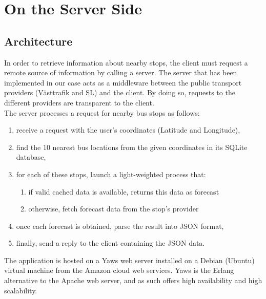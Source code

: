 \chapter{On the Server Side}
\label{cha:on_the_server_side}

\section{Architecture}

In order to retrieve information about nearby stops, the client must request a remote source of information by calling a server. The server that has been implemented in our case acts as a middleware between the public transport providers (Västtrafik and SL) and the client. By doing so, requests to the different providers are transparent to the client.\\

The server processes a request for nearby bus stops as follows:

\begin{enumerate}
\item{receive a request with the user's coordinates (Latitude and Longitude),}
\item{find the 10 nearest bus locations from the given coordinates in its SQLite database,}
\item{for each of these stops, launch a light-weighted process that:
\begin{enumerate}
	\item{if valid cached data is available, returns this data as forecast}
	\item{otherwise, fetch forecast data from the stop's provider}
\end{enumerate}
}
\item{once each forecast is obtained, parse the result into JSON format,}
\item{finally, send a reply to the client containing the JSON data.}
\end{enumerate}

The application is hosted on a Yaws web server installed on a Debian (Ubuntu) virtual machine from the Amazon cloud web services. Yaws is the Erlang alternative to the Apache web server, and as such offers high availability and high scalability.\\

